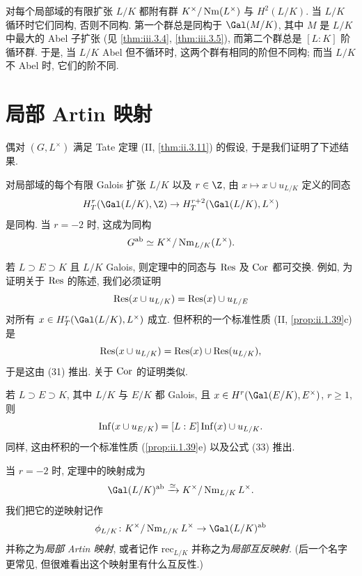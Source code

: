 \begin{remark}\label{rem:iii.2.8}
对每个局部域的有限扩张 $L/K$ 都附有群 $K^\times/\operatorname{Nm}(L^\times)$ 与 $H^2(L/K)$. 当 $L/K$ 循环时它们同构, 否则不同构. 第一个群总是同构于 $\Gal(M/K)$, 其中 $M$ 是 $L/K$ 中最大的 Abel 子扩张 (见 \ref{thm:iii.3.4}, \ref{thm:iii.3.5}), 而第二个群总是 $[L:K]$ 阶循环群. 于是, 当 $L/K$ Abel 但不循环时, 这两个群有相同的阶但不同构; 而当 $L/K$ 不 Abel 时, 它们的阶不同.
\end{remark}

\section{局部 Artin 映射}\label{sec:III.3}

偶对 $(G,L^\times)$ 满足 Tate 定理 (II, \ref{thm:ii.3.11}) 的假设, 于是我们证明了下述结果.

\begin{theorem}\label{thm:iii.3.1}
对局部域的每个有限 Galois 扩张 $L/K$ 以及 $r\in\Z$, 由 $x\mapsto x\cup u_{L/K}$ 定义的同态
\[
 H_T^r(\Gal(L/K),\Z)\to H_T^{r+2}(\Gal(L/K),L^\times)
\]
是同构. 当 $r=-2$ 时, 这成为同构
\[
 G^{\mathrm{ab}}\simeq K^\times/\operatorname{Nm}_{L/K}(L^\times).
\]

若 $L\supset E\supset K$ 且 $L/K$ Galois, 则定理中的同态与 $\operatorname{Res}$ 及 $\operatorname{Cor}$ 都可交换. 例如, 为证明关于 $\operatorname{Res}$ 的陈述, 我们必须证明
\[
 \operatorname{Res}(x\cup u_{L/K})=\operatorname{Res}(x)\cup u_{L/E}
\]
对所有 $x\in H_T^r(\Gal(L/K),L^\times)$ 成立. 但杯积的一个标准性质 (II, \ref{prop:ii.1.39}c) 是
\[
 \operatorname{Res}(x\cup u_{L/K})=\operatorname{Res}(x)\cup\operatorname{Res}(u_{L/K}),
\]
于是这由 (31) 推出. 关于 $\operatorname{Cor}$ 的证明类似.

若 $L\supset E\supset K$, 其中 $L/K$ 与 $E/K$ 都 Galois, 且 $x\in H^r(\Gal(E/K),E^\times)$, $r\ge 1$, 则
\[
 \operatorname{Inf}(x\cup u_{E/K})=[L:E]\operatorname{Inf}(x)\cup u_{L/K}.
\]
同样, 这由杯积的一个标准性质 (\ref{prop:ii.1.39}e) 以及公式 (33) 推出.
\end{theorem}

当 $r=-2$ 时, 定理中的映射成为
\[
 \Gal(L/K)^{\mathrm{ab}}\xrightarrow{\simeq}K^\times/\Nm_{L/K}L^\times.
\]
我们把它的逆映射记作
\[
 \phi_{L/K}\colon K^\times/\Nm_{L/K}L^\times\to\Gal(L/K)^{\mathrm{ab}}
\]
并称之为\emph{局部 Artin 映射}, 或者记作 $\mathrm{rec}_{L/K}$ 并称之为\emph{局部互反映射}. (后一个名字更常见, 但很难看出这个映射里有什么互反性.)

